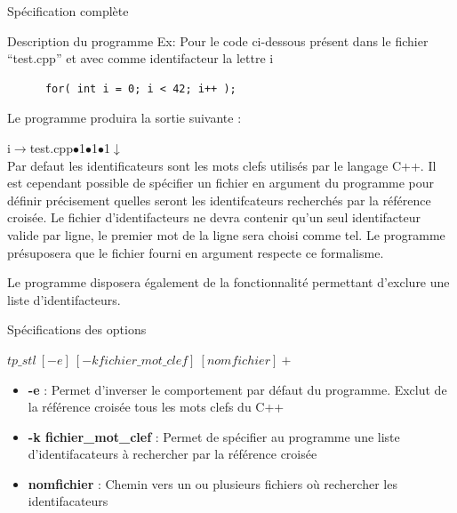 \documentclass{article}
\begin{document}
\begin{section}{Spécification complète}
\begin{subsection}{Description du programme}
    Ex: Pour le code ci-dessous présent dans le fichier ``test.cpp'' et avec comme identifacteur la lettre i 
    
    \begin{verbatim}
      for( int i = 0; i < 42; i++ );
    \end{verbatim}
    Le programme produira la sortie suivante : 

    i$\xrightarrow{}$test.cpp$\bullet$1$\bullet$1$\bullet$1$\downarrow$ \\
    
    Par defaut les identificateurs sont les mots clefs utilisés par le langage C++. Il est cependant possible de spécifier
    un fichier en argument du programme pour définir précisement quelles seront les identifcateurs recherchés par la référence
    croisée. Le fichier d'identifacteurs ne devra contenir qu'un seul identifacteur valide par ligne, le premier mot de la ligne sera choisi comme tel. Le programme présuposera que
    le fichier fourni en argument respecte ce formalisme.
    
    Le programme disposera également de la fonctionnalité permettant d'exclure une liste d'identifacteurs.
    
  \end{subsection}

  
  \newpage
  \begin{subsection}{Spécifications des options}
    \begin{center}
      \textbf{$tp\_stl\ [-e]\ [-k fichier\_mot\_clef]\ [nomfichier]+$}
    \end{center}

    \begin{itemize}
      \item[] \textbf{-e} : Permet d'inverser le comportement par défaut du programme. Exclut de la référence croisée tous les mots clefs du C++
      
      \item[] \textbf{-k fichier\_mot\_clef} : Permet de spécifier au programme une liste d'identifacateurs à rechercher par la référence croisée

      \item[] \textbf{nomfichier} : Chemin vers un ou plusieurs fichiers où rechercher les identifacateurs
    \end{itemize}

  \end{subsection}

\end{section}
\end{document}
